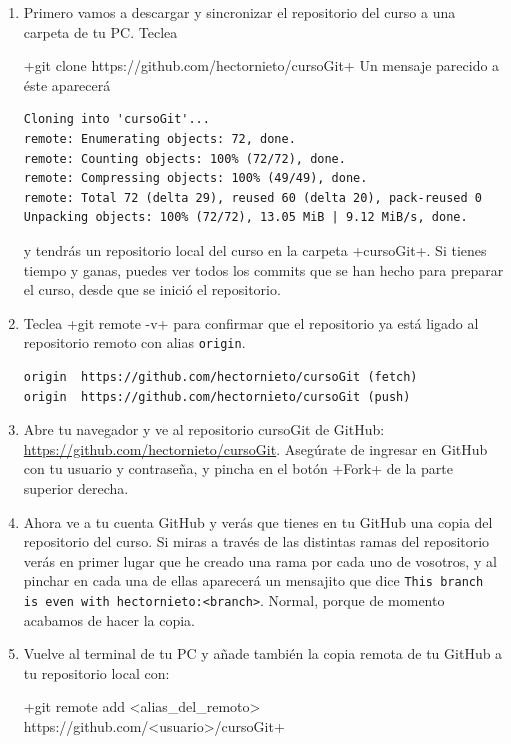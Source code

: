 \documentclass[a5paper, oneside,10pt]{article}
\begin{document}
  \begin{enumerate}
   \item Primero vamos a descargar y sincronizar el repositorio del curso a una carpeta de tu PC. Teclea
   
   \cverb+git clone https://github.com/hectornieto/cursoGit+
   Un mensaje parecido a éste aparecerá 
   
   \begin{lstlisting}[style=custom]
Cloning into 'cursoGit'...
remote: Enumerating objects: 72, done.
remote: Counting objects: 100% (72/72), done.
remote: Compressing objects: 100% (49/49), done.
remote: Total 72 (delta 29), reused 60 (delta 20), pack-reused 0
Unpacking objects: 100% (72/72), 13.05 MiB | 9.12 MiB/s, done.
   \end{lstlisting}
   y tendrás un repositorio local del curso en la carpeta \cverb+cursoGit+. Si tienes tiempo y ganas, puedes ver todos los commits que se han hecho para preparar el curso, desde que se inició el repositorio.
   
   \item Teclea \cverb+git remote -v+ para confirmar que el repositorio ya está ligado al repositorio remoto con alias \verb+origin+.
   
   \begin{lstlisting}[style=custom]
origin	https://github.com/hectornieto/cursoGit (fetch)
origin	https://github.com/hectornieto/cursoGit (push)
   \end{lstlisting}
   
   \item Abre tu navegador y ve al repositorio cursoGit de GitHub: \url{https://github.com/hectornieto/cursoGit}. Asegúrate de ingresar en GitHub con tu usuario y contraseña, y pincha en el botón \cverb+Fork+ de la parte superior derecha.
   
   \item Ahora ve a tu cuenta GitHub y verás que tienes en tu GitHub una copia del repositorio del curso. Si miras a través de las distintas ramas del repositorio verás en primer lugar que he creado una rama por cada uno de vosotros, y al pinchar en cada una de ellas aparecerá un mensajito que dice \verb+This branch is even with hectornieto:<branch>+. Normal, porque de momento acabamos de hacer la copia.
   
   \item Vuelve al terminal de tu PC y añade también la copia remota de tu GitHub a tu repositorio local con:
   
   \hspace{-3cm}\cverb+git remote add <alias_del_remoto> https://github.com/<usuario>/cursoGit+
   

\end{enumerate}
\end{document}

